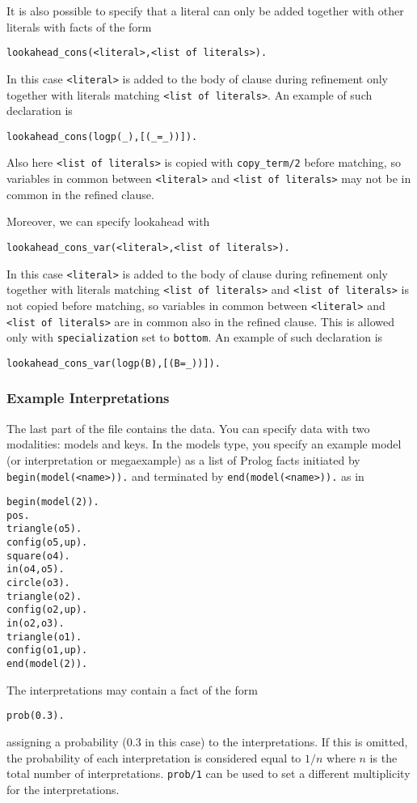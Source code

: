 It is also possible to specify that a literal can only be added together with 
other literals with facts of the form 
\begin{verbatim}
lookahead_cons(<literal>,<list of literals>).
\end{verbatim}
In this case \verb|<literal>| is added to the body of clause during refinement only together with
literals matching \verb|<list of literals>|.
An example of such declaration is
\begin{verbatim}
lookahead_cons(logp(_),[(_=_))]).
\end{verbatim}
Also here 
\verb|<list of literals>| is copied with \verb|copy_term/2| before matching, so
variables in common between \verb|<literal>| and \verb|<list of literals>|
may not be in common in the refined clause.

Moreover, we can specify lookahead with
\begin{verbatim}
lookahead_cons_var(<literal>,<list of literals>).
\end{verbatim}
In this case \verb|<literal>| is added to the body of clause during refinement only together with
literals matching \verb|<list of literals>| and \verb|<list of literals>| is not copied before matching, so
variables in common between \verb|<literal>| and \verb|<list of literals>|
are in common also in the refined clause. This is allowed only with
\verb|specialization| set to \verb|bottom|.
An example of such declaration is
\begin{verbatim}
lookahead_cons_var(logp(B),[(B=_))]).
\end{verbatim}

\subsubsection{Example Interpretations}
The last part of the file contains the data.
You can specify data with two modalities:
models and keys.
In the models type, you specify an example model (or interpretation or megaexample) as a list of Prolog facts initiated by 
\texttt{begin(model(<name>)).} and terminated by \texttt{end(model(<name>)).} as in
\begin{verbatim}
begin(model(2)).
pos.
triangle(o5).
config(o5,up).
square(o4).
in(o4,o5).
circle(o3).
triangle(o2).
config(o2,up).
in(o2,o3).
triangle(o1).
config(o1,up).
end(model(2)).
\end{verbatim}
The interpretations may contain a fact of the form
\begin{verbatim}
prob(0.3).
\end{verbatim}
assigning a probability (0.3 in this case) to the interpretations. If this is omitted, the probability of each interpretation is considered equal to $1/n$ where $n$ is the total number of interpretations. \verb|prob/1| can be used to set a different multiplicity for the interpretations.

